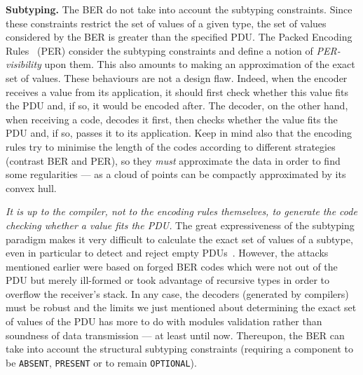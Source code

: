 \medskip

\textbf{Subtyping.} The BER do not take into account the subtyping
constraints. Since these constraints restrict the set of values of a
given type, the set of values considered by the BER is greater than
the specified PDU. The Packed Encoding Rules~\cite{X.691:2002} (PER)
consider the subtyping constraints and define a notion of
\emph{PER-visibility} upon them. This also amounts to making an
approximation of the exact set of values. These behaviours are not a
design flaw. Indeed, when the encoder receives a value from its
application, it should first check whether this value fits the PDU
and, if so, it would be encoded after. The decoder, on the other hand,
when receiving a code, decodes it first, then checks whether the value
fits the PDU and, if so, passes it to its application. Keep in mind
also that the encoding rules try to minimise the length of the codes
according to different strategies (contrast BER and PER), so they
\emph{must} approximate the data in order to find some regularities
--- as a cloud of points can be compactly approximated by its convex
hull.

\medskip

\emph{It is up to the \ASN compiler, not to the encoding rules
themselves, to generate the code checking whether a value fits the
PDU.}  The great expressiveness of the \ASN subtyping paradigm makes
it very difficult to calculate the exact set of values of a subtype,
even in particular to detect and reject empty
PDUs~\cite{Rinderknecht:2003}. However, the attacks mentioned earlier
were based on forged BER codes which were not out of the PDU but
merely ill-formed or took advantage of recursive types in order to
overflow the receiver's stack. In any case, the decoders (generated by
\ASN compilers) must be robust and the limits we just mentioned about
determining the exact set of values of the PDU has more to do with
\ASN modules validation rather than soundness of data transmission ---
at least until now. Thereupon, the BER can take into account the
structural subtyping constraints (requiring a component to be
\texttt{ABSENT}, \texttt{PRESENT} or to remain \texttt{OPTIONAL}).

\medskip

